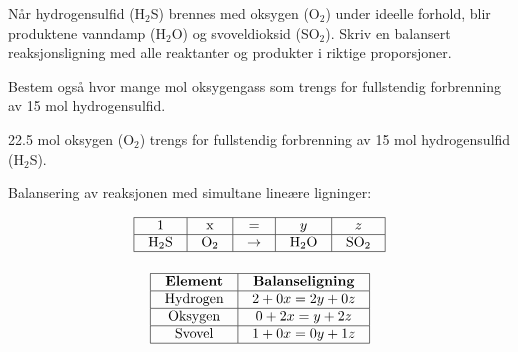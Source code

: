 

Når hydrogensulfid (H$_{2}$S) brennes med oksygen (O$_{2}$) under ideelle forhold, blir produktene vanndamp (H$_{2}$O) og svoveldioksid (SO$_{2}$). Skriv en balansert reaksjonsligning med alle reaktanter og produkter i riktige proporsjoner.

\vskip 10pt

Bestem også hvor mange mol oksygengass som trengs for fullstendig forbrenning av 15 mol hydrogensulfid.

\vskip 10pt







22.5 mol oksygen (O$_{2}$) trengs for fullstendig forbrenning av 15 mol hydrogensulfid (H$_{2}$S).







Balansering av reaksjonen med simultane lineære ligninger:


$$\vbox{\offinterlineskip
\halign{\strut
\vrule \quad\hfil # \ \hfil & 
\vrule \quad\hfil # \ \hfil & 
\vrule \quad\hfil # \ \hfil & 
\vrule \quad\hfil # \ \hfil & 
\vrule \quad\hfil # \ \hfil \vrule \cr
\noalign{\hrule}
%
1 & x & = & $y$ & $z$ \cr
%
\noalign{\hrule}
%
H$_{2}$S & O$_{2}$ & $\to$ & H$_{2}$O & SO$_{2}$ \cr
%
\noalign{\hrule}
} %
}$$ %


$$\vbox{\offinterlineskip
\halign{\strut
\vrule \quad\hfil # \ \hfil & 
\vrule \quad\hfil # \ \hfil \vrule \cr
\noalign{\hrule}
%
{\bf Element} & {\bf Balanseligning} \cr
%
\noalign{\hrule}
%
Hydrogen & $2 + 0x = 2y + 0z$ \cr
%
\noalign{\hrule}
%
Oksygen & $0 + 2x = y + 2z$ \cr
%
\noalign{\hrule}
%
Svovel & $1 + 0x = 0y + 1z$ \cr
%
\noalign{\hrule}
} %
}$$ %

